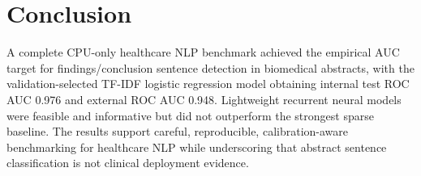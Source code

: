 \section*{Conclusion}
A complete CPU-only healthcare NLP benchmark achieved the empirical AUC target for findings/conclusion sentence detection in biomedical abstracts, with the validation-selected TF-IDF logistic regression model obtaining internal test ROC AUC 0.976 and external ROC AUC 0.948. Lightweight recurrent neural models were feasible and informative but did not outperform the strongest sparse baseline. The results support careful, reproducible, calibration-aware benchmarking for healthcare NLP while underscoring that abstract sentence classification is not clinical deployment evidence.
